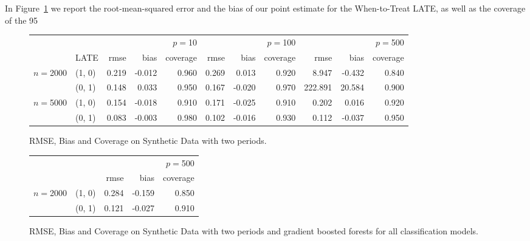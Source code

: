 In Figure~\ref{fig:experiments} we report the root-mean-squared error and the bias of our point estimate for the When-to-Treat LATE, as well as the coverage of the 95\
\begin{figure}[H]
\centering
    \begin{tabular}{ll|rrr|rrr|rrr}
\toprule
 &  & \multicolumn{3}{r}{$p=$10} & \multicolumn{3}{r}{$p=$100} & \multicolumn{3}{r}{$p=$500} \\
 & LATE & rmse & bias & coverage & rmse & bias & coverage & rmse & bias & coverage \\
\midrule
\multirow[t]{2}{*}{$n=$2000} & (1, 0) & 0.219 & -0.012 & 0.960 & 0.269 & 0.013 & 0.920 & 8.947 & -0.432 & 0.840 \\
 & (0, 1) & 0.148 & 0.033 & 0.950 & 0.167 & -0.020 & 0.970 & 222.891 & 20.584 & 0.900 \\
\cline{1-11}
\multirow[t]{2}{*}{$n=$5000} & (1, 0) & 0.154 & -0.018 & 0.910 & 0.171 & -0.025 & 0.910 & 0.202 & 0.016 & 0.920 \\
 & (0, 1) & 0.083 & -0.003 & 0.980 & 0.102 & -0.016 & 0.930 & 0.112 & -0.037 & 0.950 \\
\cline{1-11}
\bottomrule
\end{tabular}
\caption{RMSE, Bias and Coverage on Synthetic Data with two periods.}\label{fig:experiments}
\end{figure}

\begin{figure}[H]
\centering
\begin{tabular}{llrrr}
\toprule
 &  & \multicolumn{3}{r}{$p=$500} \\
 &  & rmse & bias & coverage \\
\midrule
\multirow[t]{2}{*}{$n=$2000} & (1, 0) & 0.284 & -0.159 & 0.850 \\
 & (0, 1) & 0.121 & -0.027 & 0.910 \\
\cline{1-5}
\bottomrule
\end{tabular}
\caption{RMSE, Bias and Coverage on Synthetic Data with two periods and gradient boosted forests for all classification models.}\label{fig:experiments-nonlin}
\end{figure}

